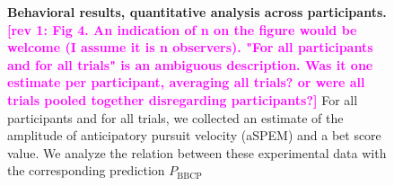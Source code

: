 \documentclass[10pt,letterpaper]{article}
\newcommand{\seeFig}[1]{Figure~\ref{fig:#1}}
\newcommand{\Rone}[1]{\textbf{\textcolor{magenta}{[rev 1: #1]}}}
\begin{document}
\begin{figure}%
\caption{%
\textbf{Behavioral results, quantitative analysis across participants.} %
\Rone{Fig 4. An indication of n on the figure would be welcome (I assume it is n observers). "For all participants and for all trials" is an ambiguous description. Was it one estimate per participant, averaging all trials? or were all trials pooled together disregarding participants?}
For all participants and for all trials, we collected an estimate of
the amplitude of anticipatory pursuit velocity (aSPEM) and a bet score value.
We analyze the relation between these experimental data with the corresponding prediction $P_{\text{BBCP}}$
}
\end{figure}
\end{document}
